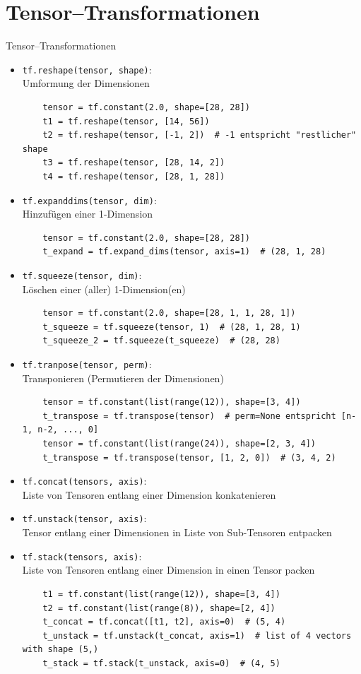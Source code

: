 \documentclass[utf8, smaller, c]{beamer}
\renewcommand{\tt}[1]{{\texttt{#1}}}
\begin{document}
\section{Tensor--Transformationen}
\begin{frame}{Tensor--Transformationen}
	\begin{itemize}
		\item \tt{tf.reshape(tensor, shape)}:\\Umformung der Dimensionen
		\begin{lstlisting}
	tensor = tf.constant(2.0, shape=[28, 28])
    t1 = tf.reshape(tensor, [14, 56])
    t2 = tf.reshape(tensor, [-1, 2])  # -1 entspricht "restlicher" shape
    t3 = tf.reshape(tensor, [28, 14, 2])
    t4 = tf.reshape(tensor, [28, 1, 28])
		\end{lstlisting}
		\item \tt{tf.expand\textunderscore dims(tensor, dim)}:\\Hinzufügen einer 1-Dimension
		\begin{lstlisting}
	tensor = tf.constant(2.0, shape=[28, 28])
    t_expand = tf.expand_dims(tensor, axis=1)  # (28, 1, 28)
		\end{lstlisting}
		\item \tt{tf.squeeze(tensor, dim)}:\\Löschen einer (aller) 1-Dimension(en)
		\begin{lstlisting}
	tensor = tf.constant(2.0, shape=[28, 1, 1, 28, 1])
    t_squeeze = tf.squeeze(tensor, 1)  # (28, 1, 28, 1)
    t_squeeze_2 = tf.squeeze(t_squeeze)  # (28, 28)
		\end{lstlisting}
		\item \tt{tf.tranpose(tensor, perm)}:\\Transponieren (Permutieren der Dimensionen)
		\begin{lstlisting}
	tensor = tf.constant(list(range(12)), shape=[3, 4])
    t_transpose = tf.transpose(tensor)  # perm=None entspricht [n-1, n-2, ..., 0]
    tensor = tf.constant(list(range(24)), shape=[2, 3, 4])
    t_transpose = tf.transpose(tensor, [1, 2, 0])  # (3, 4, 2)
		\end{lstlisting}
		\item \tt{tf.concat(tensors, axis)}:\\Liste von Tensoren entlang einer Dimension konkatenieren
		\item \tt{tf.unstack(tensor, axis)}:\\Tensor entlang einer Dimensionen in Liste von Sub-Tensoren entpacken
		\item \tt{tf.stack(tensors, axis)}:\\Liste von Tensoren entlang einer Dimension in einen Tensor packen
		\begin{lstlisting}
	t1 = tf.constant(list(range(12)), shape=[3, 4])
	t2 = tf.constant(list(range(8)), shape=[2, 4])
	t_concat = tf.concat([t1, t2], axis=0)  # (5, 4)
	t_unstack = tf.unstack(t_concat, axis=1)  # list of 4 vectors with shape (5,) 
	t_stack = tf.stack(t_unstack, axis=0)  # (4, 5)
		\end{lstlisting}
	\end{itemize}
\end{frame}
\end{document}
